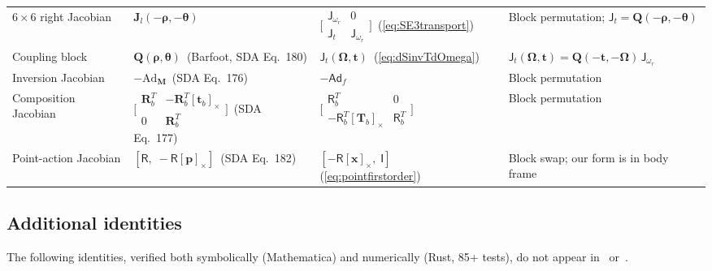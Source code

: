 \documentclass[journal]{IEEEtran}
\newcommand{\bfOmega}{\boldsymbol{\Omega}}
\newcommand{\bfrho}{\boldsymbol{\rho}}
\newcommand{\bftheta}{\boldsymbol{\theta}}
\begin{document}
\begin{table}[t]
\begin{tabular}{lllp{5.0cm}}
$6\times 6$ right Jacobian & $\mathbf{J}_l(-\bfrho,-\bftheta)$ & $\bigl[\begin{smallmatrix} \mathsf{J}_{\omega_r} & 0 \\ \mathsf{J}_t & \mathsf{J}_{\omega_r} \end{smallmatrix}\bigr]$\, (\ref{eq:SE3transport}) & Block permutation; $\mathsf{J}_t = \mathbf{Q}(-\bfrho,-\bftheta)$ \\[3pt]
Coupling block & $\mathbf{Q}(\bfrho,\bftheta)$\, (Barfoot, SDA Eq.~180) & $\mathsf{J}_t(\bfOmega,\mathbf{t})$\, (\ref{eq:dSinvTdOmega}) & $\mathsf{J}_t(\bfOmega,\mathbf{t}) = \mathbf{Q}(-\mathbf{t},-\bfOmega)\,\mathsf{J}_{\omega_r}$ \\[3pt]
Inversion Jacobian & $-\text{Ad}_\mathbf{M}$\, (SDA Eq.~176) & $-\mathsf{Ad}_f$ & Block permutation \\[3pt]
Composition Jacobian & $\bigl[\begin{smallmatrix} \mathbf{R}_b^T & -\mathbf{R}_b^T[\mathbf{t}_b]_\times \\ 0 & \mathbf{R}_b^T \end{smallmatrix}\bigr]$\, (SDA Eq.~177) & $\bigl[\begin{smallmatrix} \mathsf{R}_b^T & 0 \\ -\mathsf{R}_b^T[\mathbf{T}_b]_\times & \mathsf{R}_b^T \end{smallmatrix}\bigr]$ & Block permutation \\[3pt]
Point-action Jacobian & $[\mathsf{R},\; -\mathsf{R}[\mathbf{p}]_\times]$\, (SDA Eq.~182) & $[-\mathsf{R}[\mathbf{x}]_\times,\;\mathsf{I}]$\, (\ref{eq:pointfirstorder}) & Block swap; our form is in body frame \\[3pt]
\hline
\end{tabular}
\end{table}

\subsection{Additional identities}
\label{app:newidentities}

The following identities, verified both symbolically (Mathematica)
and numerically (Rust, 85+ tests), do not appear in~\cite{sola2018micro}
or~\cite{barfoot2024}.
\end{document}

